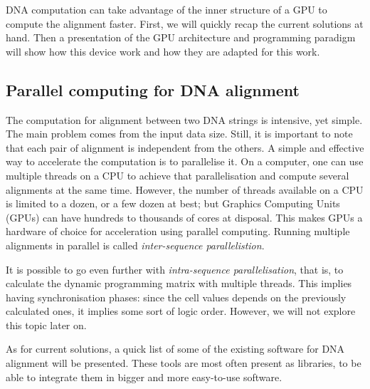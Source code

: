 DNA computation can take advantage of the inner structure of a GPU to compute the alignment faster. First, we will quickly recap the current solutions at hand. Then a presentation of the GPU architecture and programming paradigm will show how this device work and how they are adapted for this work.

\subsection{Parallel computing for DNA alignment}

The computation for alignment between two DNA strings is intensive, yet simple. The main problem comes from the input data size. Still, it is important to note that each pair of alignment is independent from the others. A simple and effective way to accelerate the computation is to parallelise it. On a computer, one can use multiple threads on a CPU to achieve that parallelisation and compute several alignments at the same time. However, the number of threads available on a CPU is limited to a dozen, or a few dozen at best; but Graphics Computing Units (GPUs) can have hundreds to thousands of cores at disposal. This makes GPUs a hardware of choice for acceleration using parallel computing. Running multiple alignments in parallel is called \emph{inter-sequence parallelistion}.

It is possible to go even further with \emph{intra-sequence parallelisation}, that is, to calculate the dynamic programming matrix with multiple threads. This implies having synchronisation phases: since the cell values depends on the previously calculated ones, it implies some sort of logic order. However, we will not explore this topic later on.

As for current solutions, a quick list of some of the existing software for DNA alignment will be presented. These tools are most often present as libraries, to be able to integrate them in bigger and more easy-to-use software.

